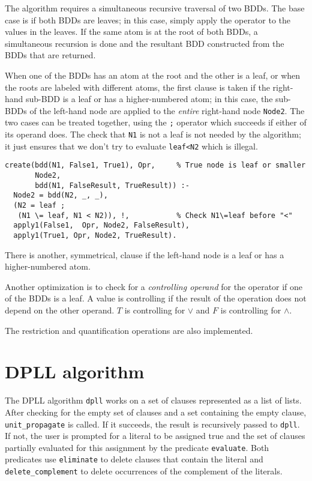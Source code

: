 \documentclass[11pt]{article}
\newcommand*{\p}[1]{\textup{\texttt{#1}}}
\begin{document}
The algorithm requires a simultaneous recursive traversal of two BDDs.
The base case is if both BDDs are leaves; in this case, simply apply the
operator to the values in the leaves. If the same atom is at the root of
both BDDs, a simultaneous recursion is done and the resultant BDD
constructed from the BDDs that are returned.

When one of the BDDs has an atom at the root and the other is a leaf, or
when the roots are labeled with different atoms, the first clause is
taken if the right-hand sub-BDD is a leaf or has a higher-numbered atom;
in this case, the sub-BDDs of the left-hand node are applied to the
\emph{entire} right-hand node \p{Node2}. The two cases can be treated
together, using the \p{;} operator which succeeds if either of its
operand does. The check that \p{N1} is not a leaf is not needed by the
algorithm; it just ensures that we don't try to evaluate \p{leaf<N2}
which is illegal.

\begin{verbatim}
create(bdd(N1, False1, True1), Opr,     % True node is leaf or smaller
       Node2,
       bdd(N1, FalseResult, TrueResult)) :-
  Node2 = bdd(N2, _, _),                   
  (N2 = leaf ;
   (N1 \= leaf, N1 < N2)), !,           % Check N1\=leaf before "<"
  apply1(False1,  Opr, Node2, FalseResult),
  apply1(True1, Opr, Node2, TrueResult).
\end{verbatim}

There is another, symmetrical, clause if the left-hand node is a leaf or
has a higher-numbered atom.

Another optimization is to check for a \emph{controlling operand}
for the operator if one of the BDDs is a leaf. A value is controlling if
the result of the operation does not depend on the other operand. $T$ is
controlling for $\vee$ and $F$ is controlling for $\wedge$.

The restriction and quantification operations are also implemented.


\section{DPLL algorithm}

The DPLL algorithm \p{dpll} works on a set of clauses represented as a
list of lists. After checking for the empty set of clauses and a set
containing the empty clause, \p{unit\_propagate} is called. If it
succeeds, the result is recursively passed to \p{dpll}. If not, the user
is prompted for a literal to be assigned true and the set of clauses
partially evaluated for this assignment by the predicate \p{evaluate}.
Both predicates use \p{eliminate} to delete clauses that contain the
literal and \p{delete\_complement} to delete occurrences of the
complement of the literals.
\end{document}
